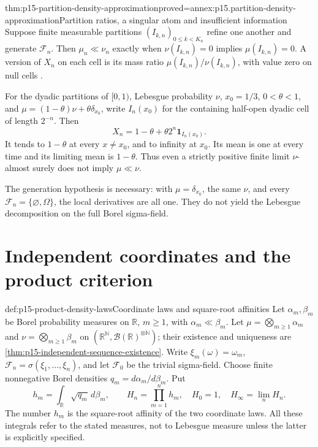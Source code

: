 \begin{hbtheorem}{thm:p15-partition-density-approximation}{proved=annex:p15.partition-density-approximation}{Partition ratios, a singular atom and insufficient information}
Suppose finite measurable partitions
\((I_{k,n})_{0\leq k<K_n}\) refine one another and generate
\(\mathcal F_n\). Then \(\mu_n\ll\nu_n\) exactly when
\(\nu(I_{k,n})=0\) implies \(\mu(I_{k,n})=0\).
A version of \(X_n\) on each cell is its mass ratio
\(\mu(I_{k,n})/\nu(I_{k,n})\), with value zero on null cells
\cite[Example~4.3.7]{DurrettPTEAuthor2019}.

For the dyadic partitions of \([0,1)\), Lebesgue probability \(\nu\),
\(x_0=1/3\), \(0<\theta<1\), and
\(\mu=(1-\theta)\nu+\theta\delta_{x_0}\), write \(I_n(x_0)\)
for the containing half-open dyadic cell of length \(2^{-n}\).
Then
\[
                 X_n=1-\theta+\theta2^n\mathbf1_{I_n(x_0)}.
\]
It tends to \(1-\theta\) at every \(x\ne x_0\), and to infinity
at \(x_0\). Its mean is one at every time and its limiting mean is
\(1-\theta\). Thus even a strictly positive finite limit
\(\nu\)-almost surely does not imply \(\mu\ll\nu\).

The generation hypothesis is necessary: with \(\mu=\delta_{x_0}\),
the same \(\nu\), and every \(\mathcal F_n=\{\varnothing,\Omega\}\),
the local derivatives are all one. They do not yield the Lebesgue
decomposition on the full Borel sigma-field.
\end{hbtheorem}

\section{Independent coordinates and the product criterion}

\begin{hbdefinition}{def:p15-product-density-laws}{Coordinate laws and square-root affinities}
Let \(\alpha_m,\beta_m\) be Borel probability measures on \(\mathbb R\),
\(m\geq1\), with \(\alpha_m\ll\beta_m\).
Let \(\mu=\bigotimes_{m\geq1}\alpha_m\) and
\(\nu=\bigotimes_{m\geq1}\beta_m\) on
\((\mathbb R^{\mathbb N},\mathcal B(\mathbb R)^{\otimes\mathbb N})\);
their existence and uniqueness are
\cref{thm:p15-independent-sequence-existence}.
Write \(\xi_m(\omega)=\omega_m\),
\(\mathcal F_n=\sigma(\xi_1,\ldots,\xi_n)\), and let
\(\mathcal F_0\) be the trivial sigma-field.
Choose finite nonnegative Borel densities \(q_m=d\alpha_m/d\beta_m\).
Put
\[
 h_m=\int_{\mathbb R}\sqrt{q_m}\,d\beta_m,\qquad
 H_n=\prod_{m=1}^nh_m,\quad H_0=1,\quad H_\infty=\lim_nH_n.
\]
The number \(h_m\) is the square-root affinity of the two coordinate
laws. All these integrals refer to the stated measures, not to
Lebesgue measure unless the latter is explicitly specified.
\end{hbdefinition}

